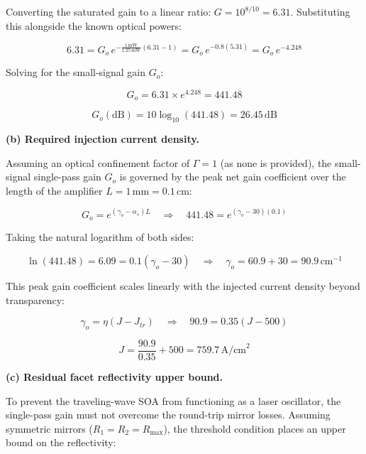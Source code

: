 Converting the saturated gain to a linear ratio: $G = 10^{8/10} = 6.31$. Substituting this alongside the known optical powers:

\begin{equation*}
  6.31 = G_o \, e^{- \frac{1\,\text{mW}}{1.25\,\text{mW}} (6.31 - 1)} = G_o \, e^{-0.8(5.31)} = G_o \, e^{-4.248}
\end{equation*}

Solving for the small-signal gain $G_o$:

\begin{equation*}
  G_o = 6.31 \times e^{4.248} = 441.48
\end{equation*}

\begin{equation*}
  \boxed{G_o (\text{dB}) = 10 \log_{10}(441.48) = 26.45\,\text{dB}}
\end{equation*}

\textbf{(b) Required injection current density.}

Assuming an optical confinement factor of $\Gamma = 1$ (as none is provided), the small-signal single-pass gain $G_o$ is governed by the peak net gain coefficient over the length of the amplifier $L = 1\,\text{mm} = 0.1\,\text{cm}$:

\begin{equation*}
  G_o = e^{(\gamma_o - \alpha_s)L} \quad\Longrightarrow\quad 441.48 = e^{(\gamma_o - 30)(0.1)}
\end{equation*}

Taking the natural logarithm of both sides:

\begin{equation*}
  \ln(441.48) = 6.09 = 0.1(\gamma_o - 30) \quad\Longrightarrow\quad \gamma_o = 60.9 + 30 = 90.9\,\text{cm}^{-1}
\end{equation*}

This peak gain coefficient scales linearly with the injected current density beyond transparency:

\begin{equation*}
  \gamma_o = \eta (J - J_{tr}) \quad\Longrightarrow\quad 90.9 = 0.35 (J - 500)
\end{equation*}

\begin{equation*}
  \boxed{J = \frac{90.9}{0.35} + 500 = 759.7\,\text{A/cm}^2}
\end{equation*}

\textbf{(c) Residual facet reflectivity upper bound.}

To prevent the traveling-wave SOA from functioning as a laser oscillator, the single-pass gain must not overcome the round-trip mirror losses. Assuming symmetric mirrors ($R_1 = R_2 = R_{\text{max}}$), the threshold condition places an upper bound on the reflectivity:

